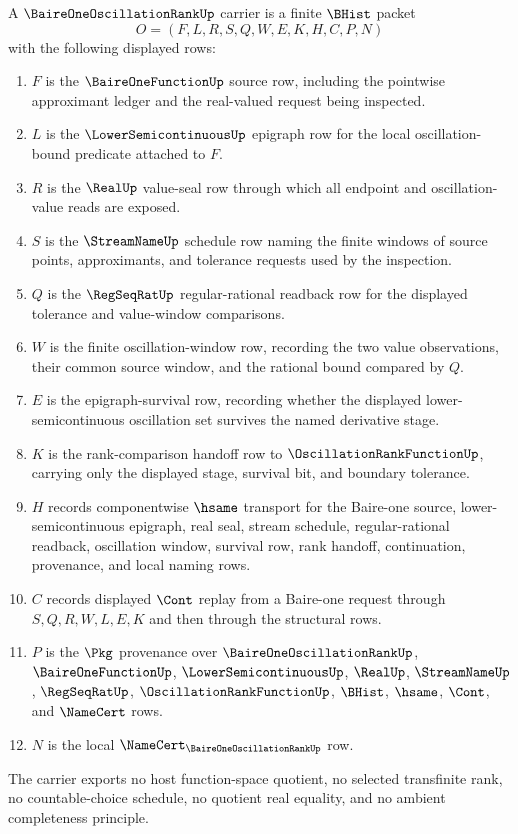 \begin{definition}
\label{def:baire-one-oscillation-rank-carrier}
A $\BaireOneOscillationRankUp$ carrier is a finite $\BHist$ packet
$$
O=(F,L,R,S,Q,W,E,K,H,C,P,N)
$$
with the following displayed rows:
\begin{enumerate}
\item $F$ is the $\BaireOneFunctionUp$ source row, including the pointwise approximant ledger and the real-valued request being inspected.
\item $L$ is the $\LowerSemicontinuousUp$ epigraph row for the local oscillation-bound predicate attached to $F$.
\item $R$ is the $\RealUp$ value-seal row through which all endpoint and oscillation-value reads are exposed.
\item $S$ is the $\StreamNameUp$ schedule row naming the finite windows of source points, approximants, and tolerance requests used by the inspection.
\item $Q$ is the $\RegSeqRatUp$ regular-rational readback row for the displayed tolerance and value-window comparisons.
\item $W$ is the finite oscillation-window row, recording the two value observations, their common source window, and the rational bound compared by $Q$.
\item $E$ is the epigraph-survival row, recording whether the displayed lower-semicontinuous oscillation set survives the named derivative stage.
\item $K$ is the rank-comparison handoff row to $\OscillationRankFunctionUp$, carrying only the displayed stage, survival bit, and boundary tolerance.
\item $H$ records componentwise $\hsame$ transport for the Baire-one source, lower-semicontinuous epigraph, real seal, stream schedule, regular-rational readback, oscillation window, survival row, rank handoff, continuation, provenance, and local naming rows.
\item $C$ records displayed $\Cont$ replay from a Baire-one request through $S,Q,R,W,L,E,K$ and then through the structural rows.
\item $P$ is the $\Pkg$ provenance over $\BaireOneOscillationRankUp$, $\BaireOneFunctionUp$, $\LowerSemicontinuousUp$, $\RealUp$, $\StreamNameUp$, $\RegSeqRatUp$, $\OscillationRankFunctionUp$, $\BHist$, $\hsame$, $\Cont$, and $\NameCert$ rows.
\item $N$ is the local $\NameCert_{\BaireOneOscillationRankUp}$ row.
\end{enumerate}
The carrier exports no host function-space quotient, no selected transfinite rank, no countable-choice schedule, no quotient real equality, and no ambient completeness principle.
\end{definition}

